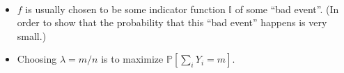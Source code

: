         \begin{remark}~{}
            \begin{itemize}
                \item $f$ is usually chosen to be some indicator function $\mathbb{I}$ of some ``bad event''. (In order to show that the probability that this ``bad event'' happens is very small.)
                \item Choosing $\lambda = m/n$ is to maximize $\mathbb{P}[\sum_i Y_i=m]$.
            \end{itemize}
        \end{remark}
